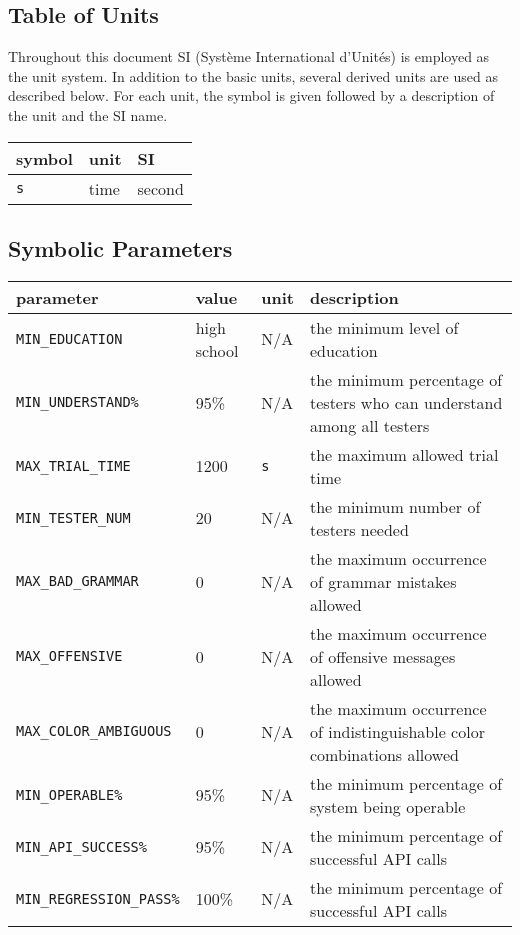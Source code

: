 \documentclass[12pt]{article}
\begin{document}
\subsection{Table of Units}

Throughout this document SI (Syst\`{e}me International d'Unit\'{e}s) is employed
as the unit system.  In addition to the basic units, several derived units are
used as described below.  For each unit, the symbol is given followed by a
description of the unit and the SI name.

\begin{tabular}{ |l|l|l|  }

\hline
symbol & unit & SI \\
\hline
\texttt{s} & time & second\\
\hline
\end{tabular}

\subsection{Symbolic Parameters}

\begin{tabular}{|l|l|l|p{5cm}|}

\hline
parameter & value & unit & description\\
\hline
\texttt{MIN\_EDUCATION} & high school & N/A & the minimum level of education\\
\hline
\texttt{MIN\_UNDERSTAND\%} & 95\% & N/A & the minimum percentage of testers who can understand among all testers\\
\hline
\texttt{MAX\_TRIAL\_TIME} & 1200 & \texttt{s} & the maximum allowed trial time\\
\hline
\texttt{MIN\_TESTER\_NUM} &  20& N/A & the minimum number of testers needed\\
\hline
\texttt{MAX\_BAD\_GRAMMAR} & 0& N/A & the maximum occurrence of grammar mistakes allowed \\
\hline
\texttt{MAX\_OFFENSIVE} & 0& N/A & the maximum occurrence of offensive messages allowed\\
\hline
\texttt{MAX\_COLOR\_AMBIGUOUS} & 0& N/A & the maximum occurrence of indistinguishable color combinations allowed\\
\hline
\texttt{MIN\_OPERABLE\%} & 95\% & N/A & the minimum percentage of system being operable \\
\hline
\texttt{MIN\_API\_SUCCESS\%} & 95\% & N/A &  the minimum percentage of successful API calls\\
\hline
\texttt{MIN\_REGRESSION\_PASS\%} & 100\%  & N/A &  the minimum percentage of successful API calls\\
\hline
\end{tabular}
\end{document}
